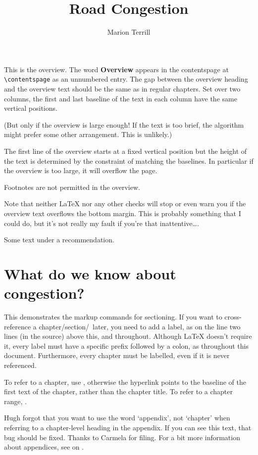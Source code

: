 \documentclass{grattan}
\author{Marion Terrill}
\title{Road Congestion}
\begin{document}
\begin{overview}
This is the overview. 
The word \textbf{Overview} appears in the contentspage at \verb=\contentspage= as an unnumbered entry.
The gap between the overview heading and the overview text should be the same as in regular chapters. 
Set over two columns, the first and last baseline of the text in each column have the same vertical positions.

(But only if the overview is large enough!
If the text is too brief, the algorithm might prefer some other arrangement.
This is unlikely.) 

The first line of the overview starts at a fixed vertical position but the height of the text is determined by the constraint of matching the baselines.
In particular if the overview is too large, it will overflow the page.

Footnotes are not permitted in the overview.

Note that neither \LaTeX{} nor any other checks will stop or even warn you if the overview text overflows the bottom margin.
This is probably something that I could do, but it's not really my fault if you're that inattentive\dots . 
\end{overview}

\begin{recommendations}
\label{rec:use-labels}
Some text under a recommendation.
\end{recommendations}

\contentspage

\chapter{What do we know about congestion?}\label{chap:1}
This demonstrates the markup commands for sectioning. 
If you want to cross-reference a chapter/section/\etc\ later, you need to add a label, as on the line two lines (in the source) above this, and throughout.
Although \LaTeX{} doesn't require it, every label must have a specific prefix followed by a colon, as throughout this document.
Furthermore, every chapter must be labelled, even if it is never referenced.

To refer to a chapter, use , %
otherwise the hyperlink points to the baseline of the first text of the chapter, rather than the chapter title.
To refer to a chapter range, .

Hugh forgot that you want to use the word `appendix', not `chapter' when referring to a chapter-level heading in the appendix.
If you can see this text, that bug should be fixed.
Thanks to Carmela for filing. 
For a bit more information about appendices, see  on . 
\end{document}
